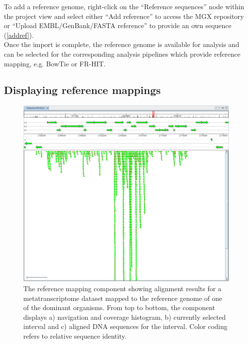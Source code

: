 To add a reference genome, right-click on the ``Reference sequences'' node within the
project view and select either ``Add reference'' to access the MGX repository or
``Upload EMBL/GenBank/FASTA reference'' to provide an own sequence (\ref{addref}).\\

Once the import is complete, the reference genome is available for analysis and
can be selected for the corresponding analysis pipelines which provide reference
mapping, e.g. BowTie or FR-HIT.

\subsection{Displaying reference mappings}

\begin{figure}[H]
\centering
\includegraphics[width=\textwidth]{img/mgx/RefMapping}
\caption[Reference mapping]{The reference mapping component showing alignment results for a metatranscriptome dataset mapped to the reference genome of one of the dominant organisms. From top to bottom, the component displays a) navigation and coverage histogram, b) currently selected interval and c) aligned DNA sequences for the interval. Color coding refers to relative sequence identity.}
\label{refmap}
\end{figure}

